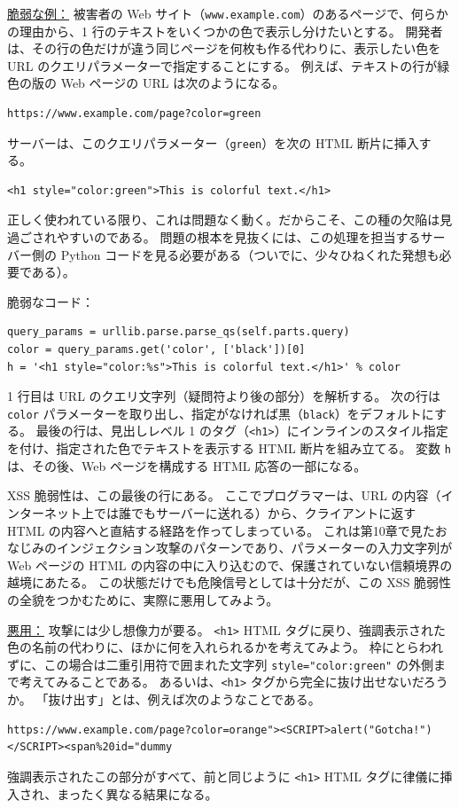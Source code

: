 \documentclass[uplatex]{jsarticle}
\begin{document}
\underline{脆弱な例：}
被害者の Web サイト（\texttt{www.example.com}）のあるページで、何らかの理由から、1 行のテキストをいくつかの色で表示し分けたいとする。
開発者は、その行の色だけが違う同じページを何枚も作る代わりに、表示したい色を URL のクエリパラメーターで指定することにする。
例えば、テキストの行が緑色の版の Web ページの URL は次のようになる。
\begin{verbatim}
https://www.example.com/page?color=green
\end{verbatim}
サーバーは、このクエリパラメーター（\texttt{green}）を次の HTML 断片に挿入する。
\begin{verbatim}
<h1 style="color:green">This is colorful text.</h1>
\end{verbatim}
正しく使われている限り、これは問題なく動く。だからこそ、この種の欠陥は見過ごされやすいのである。
問題の根本を見抜くには、この処理を担当するサーバー側の Python コードを見る必要がある（ついでに、少々ひねくれた発想も必要である）。

脆弱なコード：
\begin{verbatim}
query_params = urllib.parse.parse_qs(self.parts.query)
color = query_params.get('color', ['black'])[0]
h = '<h1 style="color:%s">This is colorful text.</h1>' % color
\end{verbatim}
1 行目は URL のクエリ文字列（疑問符より後の部分）を解析する。
次の行は \texttt{color} パラメーターを取り出し、指定がなければ黒（\texttt{black}）をデフォルトにする。
最後の行は、見出しレベル 1 のタグ（\texttt{<h1>}）にインラインのスタイル指定を付け、指定された色でテキストを表示する HTML 断片を組み立てる。
変数 \texttt{h} は、その後、Web ページを構成する HTML 応答の一部になる。

XSS 脆弱性は、この最後の行にある。
ここでプログラマーは、URL の内容（インターネット上では誰でもサーバーに送れる）から、クライアントに返す HTML の内容へと直結する経路を作ってしまっている。
これは第10章で見たおなじみのインジェクション攻撃のパターンであり、パラメーターの入力文字列が Web ページの HTML の内容の中に入り込むので、保護されていない信頼境界の越境にあたる。
この状態だけでも危険信号としては十分だが、この XSS 脆弱性の全貌をつかむために、実際に悪用してみよう。

\underline{悪用：}
攻撃には少し想像力が要る。
\texttt{<h1>} HTML タグに戻り、強調表示された色の名前の代わりに、ほかに何を入れられるかを考えてみよう。
枠にとらわれずに、この場合は二重引用符で囲まれた文字列 \texttt{style="color:green"} の外側まで考えてみることである。
あるいは、\texttt{<h1>} タグから完全に抜け出せないだろうか。
「抜け出す」とは、例えば次のようなことである。
{\footnotesize
\begin{verbatim}
https://www.example.com/page?color=orange"><SCRIPT>alert("Gotcha!")</SCRIPT><span%20id="dummy
\end{verbatim}
}
強調表示されたこの部分がすべて、前と同じように \texttt{<h1>} HTML タグに律儀に挿入され、まったく異なる結果になる。
\end{document}
